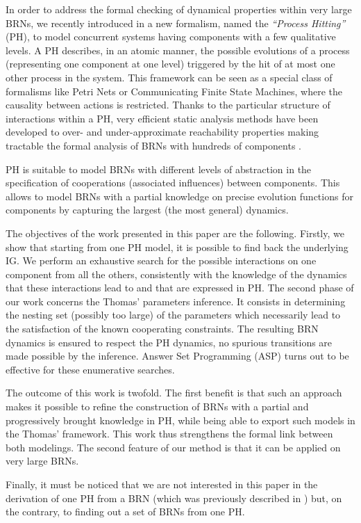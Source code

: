 In order to address the formal checking of dynamical properties within very large BRNs, we recently
introduced in \cite{PMR10-TCSB} a new formalism, named the \emph{``Process Hitting''} (PH), to model
concurrent systems having components with a few qualitative levels.
A PH describes, in an atomic manner, the possible evolutions of a process (representing one
component at one level) triggered by the hit of at most one other process in the system.
This framework can be seen as a special class of formalisms like Petri Nets or Communicating Finite
State Machines, where the causality between actions is restricted.
Thanks to the particular structure of interactions within a PH, very efficient static analysis
methods have been developed to over- and under-approximate reachability properties making tractable
the formal analysis of BRNs with hundreds of components \cite{PMR12-MSCS}.

PH is suitable to model BRNs with different levels of abstraction in the specification of
cooperations (associated influences) between components.
This allows to model BRNs with a partial knowledge on precise evolution functions for components
by capturing the largest (the most general) dynamics.

The objectives of the work presented in this paper are the following.
Firstly, we show that starting from one PH model, it is possible to find back the underlying IG.
We perform an exhaustive search for the possible interactions on one component from all the
others, consistently with the knowledge of the dynamics that these interactions lead to and that are
expressed in PH.
The second phase of our work concerns the Thomas' parameters inference.
It consists in determining the nesting set (possibly too large) of the parameters which necessarily
lead to the satisfaction of the known cooperating constraints.
The resulting BRN dynamics is ensured to respect the PH dynamics, \ie no spurious transitions are
made possible by the inference.
Answer Set Programming (ASP) \cite{Baral03} turns out to be effective for these enumerative searches.

The outcome of this work is twofold.
The first benefit is that such an approach makes it possible to refine the construction of
BRNs with a partial and progressively brought knowledge in PH, while being able to export such
models in the Thomas' framework.
This work thus strengthens the formal link between both modelings.
The second feature of our method is that it can be applied on very large BRNs.

Finally, it must be noticed that we are not interested in this paper in the derivation of one
PH from a BRN (which was previously described in \cite{PMR10-TCSB}) but, on the contrary, to finding out
a set of BRNs from one PH.

